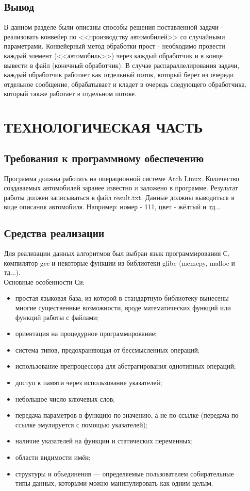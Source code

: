 \documentclass[a4paper,12pt]{article}
\begin{document}
\newpage
\subsection{Вывод}
В данном разделе были описаны способы решения поставленной задачи - реализовать конвейер по <<производству автомобилей>> со случайными параметрами. Конвейерный метод обработки прост - необходимо провести каждый элемент (<<автомобиль>>) через каждый обработчик и в конце вывести в файл (конечный обработчик). В случае распараллелирования задачи, каждый обработчик работает как отдельный поток, который берет из очереди отдельное сообщение, обрабатывает и кладет в очередь следующего обработчика, который также работает в отдельном потоке.


\newpage
\section{ТЕХНОЛОГИЧЕСКАЯ ЧАСТЬ}
\subsection{Требования к программному обеспечению}
Программа должна работать на операционной системе Arch Linux. Количество создаваемых автомобилей заранее известно и заложено в программе. Результат работы должен записываться в файл result.txt. Данные должны выводиться в виде описания автомобиля. Например: номер - 111, цвет - жёлтый и тд...

\newpage
\subsection{Средства реализации}
Для реализации данных алгоритмов был выбран язык программирования С, компилятор gcc и некоторые функции из библиотеки glibc (memcpy, malloc и тд...). \\
Основные особенности Си:
\begin{itemize}
\item простая языковая база, из которой в стандартную библиотеку вынесены многие существенные возможности, вроде математических функций или функций работы с файлами;
\item ориентация на процедурное программирование;
\item система типов, предохраняющая от бессмысленных операций;
\item использование препроцессора для абстрагирования однотипных операций;
\item доступ к памяти через использование указателей;
\item небольшое число ключевых слов;
\item передача параметров в функцию по значению, а не по ссылке (передача по ссылке эмулируется с помощью указателей);
\item наличие указателей на функции и статических переменных;
\item области видимости имён;
\item структуры и объединения — определяемые пользователем собирательные типы данных, которыми можно манипулировать как одним целым.
\end{itemize}
\end{document}
